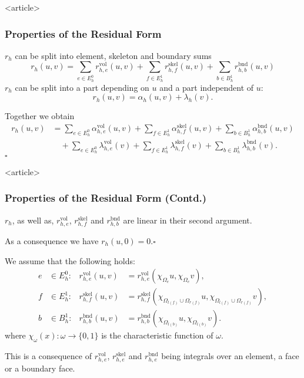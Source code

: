 \begin{frame}<article>
\frametitle<presentation>{Properties of the Residual Form}
\begin{Pro}[Splitting]
$r_h$ can be split into element, skeleton and boundary sums
\begin{equation*}
r_h(u,v) = \sum_{e\in E^0_h} r^\text{vol}_{h,e}(u,v) + \sum_{f\in E^1_h} r^\text{skel}_{h,f}(u,v)
+ \sum_{b\in B^1_h} r^\text{bnd}_{h,b}(u,v)
\end{equation*}
$r_h$ can be split into a part depending
on $u$ and a part independent of $u$:
\begin{equation*}
r_h(u,v) = \alpha_h(u,v) + \lambda_h(v) .
\end{equation*}

Together we obtain
\begin{equation}
\begin{split}
r_h(u,v) &= \sum_{e\in E^0_h} \alpha^\text{vol}_{h,e}(u,v) + \sum_{f\in E^1_h} \alpha^\text{skel}_{h,f}(u,v)
+ \sum_{b\in B^1_h} \alpha^\text{bnd}_{h,b}(u,v)\\
&\quad + \sum_{e\in E^0_h} \lambda^\text{vol}_{h,e}(v) + \sum_{f\in E^1_h} \lambda^\text{skel}_{h,f}(v)
+ \sum_{b\in B^1_h} \lambda^\text{bnd}_{h,b}(v) .
\end{split}
\end{equation}
\hfill$\square$
\end{Pro}
\end{frame}

\begin{frame}<article>
\frametitle<presentation>{Properties of the Residual Form (Contd.)}
\begin{Pro}[Linearity]\label{Ass:Linearity}
$r_h$, as well as, $r^\text{vol}_{h,e}$, $r^\text{skel}_{h,f}$ and
$r^\text{bnd}_{h,b}$ are linear in their second
argument.

As a consequence we have $r_h(u,0)=0$.\hfill$\square$
\end{Pro}
\begin{Pro}[Localization]
We assume that the following holds:
\begin{subequations}
\begin{align*}
e&\in E^0_h : & r^\text{vol}_{h,e}(u,v) &= r^\text{vol}_{h,e}(\chi_{\Omega_e} u,\chi_{\Omega_e} v),\\
f&\in E^1_h : & r^\text{skel}_{h,f}(u,v) &=
r^\text{skel}_{h,f}(\chi_{\Omega_{l(f)}\cup\Omega_{r(f)}}
u,\chi_{\Omega_{l(f)}\cup\Omega_{r(f)}} v),\\
b&\in B^1_h : & r^\text{bnd}_{h,b}(u,v) &= r^\text{bnd}_{h,b}(\chi_{\Omega_{l(b)}} u,\chi_{\Omega_{l(b)}} v).
\end{align*}
\end{subequations}
where $\chi_\omega(x) : \omega \to \{0,1\}$ is the characteristic function of $\omega$.

This is a consequence of  $r^\text{vol}_{h,e}$, $r^\text{skel}_{h,e}$
and $r^\text{bnd}_{h,e}$ being integrals over an element, a face or a
boundary face.
\end{Pro}
\end{frame}

\cleardoublepage
